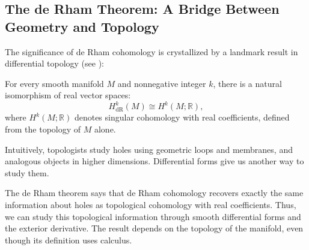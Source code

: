 
\subsection{The de Rham Theorem: A Bridge Between Geometry and Topology}
The significance of de Rham cohomology is crystallized by a landmark result in
differential topology (see \cite[Proposition~18.13, pp.~482--483;
Theorem~18.14, p.~484]{lee2013smooth}):

\begin{theorem}[de Rham]
    \label{thm:de_rham}
    For every smooth manifold $M$ and nonnegative integer $k$, there is a
    natural isomorphism of real vector spaces:
    \begin{equation}
        H^k_{\mathrm{dR}}(M) \cong H^k(M; \mathbb{R}),
    \end{equation}
    where $H^k(M; \mathbb{R})$ denotes singular cohomology with real
    coefficients, defined from the topology of $M$ alone.
\end{theorem}

Intuitively, topologists study holes using geometric loops and membranes,
and analogous objects in higher dimensions. Differential forms give us
another way to study them.

The de Rham theorem says that de Rham cohomology recovers exactly the same
information about holes as topological cohomology with real coefficients.
Thus, we can study this topological information through smooth differential
forms and the exterior derivative. The result depends on the topology of the
manifold, even though its definition uses calculus.

